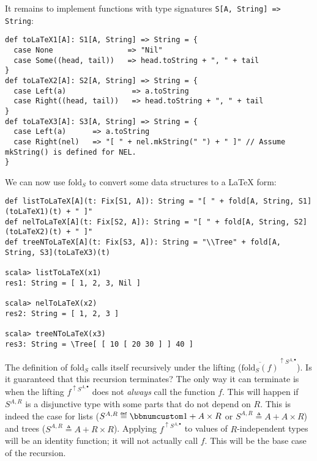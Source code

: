 It remains to implement functions with type signatures \lstinline!S[A, String] => String!:
\begin{lstlisting}
def toLaTeX1[A]: S1[A, String] => String = {
  case None                 => "Nil"
  case Some((head, tail))   => head.toString + ", " + tail
}
def toLaTeX2[A]: S2[A, String] => String = {
  case Left(a)               => a.toString
  case Right((head, tail))   => head.toString + ", " + tail
}
def toLaTeX3[A]: S3[A, String] => String = {
  case Left(a)      => a.toString
  case Right(nel)   => "[ " + nel.mkString(" ") + " ]" // Assume mkString() is defined for NEL.
}
\end{lstlisting}
We can now use $\text{fold}_{S}$ to convert some data structures
to a \LaTeX{} form:
\begin{lstlisting}
def listToLaTeX[A](t: Fix[S1, A]): String = "[ " + fold[A, String, S1](toLaTeX1)(t) + " ]"
def nelToLaTeX[A](t: Fix[S2, A]): String = "[ " + fold[A, String, S2](toLaTeX2)(t) + " ]"
def treeNToLaTeX[A](t: Fix[S3, A]): String = "\\Tree" + fold[A, String, S3](toLaTeX3)(t)

scala> listToLaTeX(x1)
res1: String = [ 1, 2, 3, Nil ]

scala> nelToLaTeX(x2)
res2: String = [ 1, 2, 3 ]

scala> treeNToLaTeX(x3)
res3: String = \Tree[ [ 10 [ 20 30 ] ] 40 ]
\end{lstlisting}

The definition of $\text{fold}_{S}$ calls itself recursively under
the lifting ($\overline{\text{fold}_{S}(f)}^{\uparrow S^{A,\bullet}}$).
Is it guaranteed that this recursion terminates? The only way it can
terminate is when the lifting $f^{\uparrow S^{A,\bullet}}$ does not
\emph{always} call the function $f$. This will happen if $S^{A,R}$
is a disjunctive type with some parts that do not depend on $R$.
This is indeed the case for lists ($S^{A,R}\triangleq\bbnum 1+A\times R$
or $S^{A,R}\triangleq A+A\times R$) and trees ($S^{A,R}\triangleq A+R\times R$).
Applying $f^{\uparrow S^{A,\bullet}}$ to values of $R$-independent
types will be an identity function; it will not actually call $f$.
This will be the base case of the recursion.

